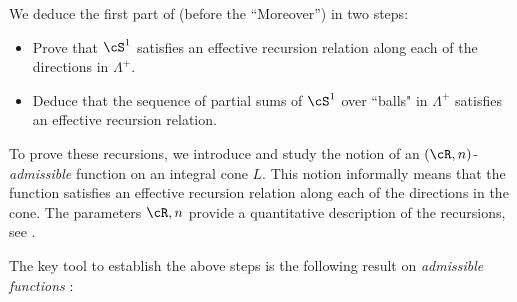 \documentclass[12pt,a4paper]{amsart}%
\newcommand{\RamiA}[1]{{{#1}}}
\newcommand{\EitanD}[1]{{{#1}}}
\newcommand{\EitanC}[1]{{{#1}}}
\begin{document}
\EitanC{We deduce the first part of  (before the ``\EitanD{M}oreover'') in two steps:
\begin{itemize}
    \item Prove that $\cS^1$ satisfies an effective recursion relation along each of the directions in $\Lambda^+$.
    \item Deduce that the sequence of partial sums of $\cS^1$ over ``balls" in $\Lambda^+$ satisfies an effective recursion relation.
\end{itemize}
To prove these recursions, we introduce and study the notion of an $(\cR,n)$-\EitanD{\it admissible} function on an integral cone $L$. This notion informally means that the function satisfies an effective recursion relation along each of the directions in the cone.
\RamiA{The parameters $\cR,n$ provide a quantitative  description of the recursions,} see  \Cref{def:adm}.

The key tool to establish the above steps is the
following  
\EitanD{result on \it{admissible} functions} : 
}

\end{document}
